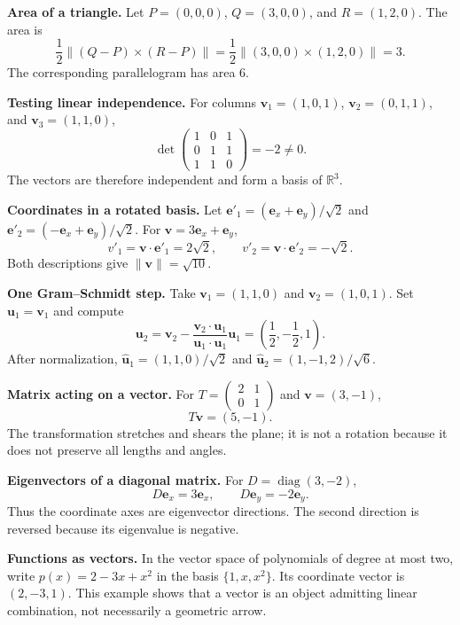 \begin{workedexample}
\textbf{Area of a triangle.}
Let $P=(0,0,0)$, $Q=(3,0,0)$, and $R=(1,2,0)$. The area is
\[
\frac12\lVert(Q-P)\times(R-P)\rVert
=\frac12\lVert(3,0,0)\times(1,2,0)\rVert=3.
\]
The corresponding parallelogram has area $6$.
\end{workedexample}

\begin{workedexample}
\textbf{Testing linear independence.}
For columns $\mathbf v_1=(1,0,1)$, $\mathbf v_2=(0,1,1)$, and
$\mathbf v_3=(1,1,0)$,
\[
\det\begin{pmatrix}1&0&1\\0&1&1\\1&1&0\end{pmatrix}=-2\neq0.
\]
The vectors are therefore independent and form a basis of $\mathbb R^3$.
\end{workedexample}

\begin{workedexample}
\textbf{Coordinates in a rotated basis.}
Let $\mathbf e'_1=(\mathbf e_x+\mathbf e_y)/\sqrt2$ and
$\mathbf e'_2=(-\mathbf e_x+\mathbf e_y)/\sqrt2$. For
$\mathbf v=3\mathbf e_x+\mathbf e_y$,
\[
v'_1=\mathbf v\cdot\mathbf e'_1=2\sqrt2,
\qquad
v'_2=\mathbf v\cdot\mathbf e'_2=-\sqrt2.
\]
Both descriptions give $\lVert\mathbf v\rVert=\sqrt{10}$.
\end{workedexample}

\begin{workedexample}
\textbf{One Gram--Schmidt step.}
Take $\mathbf v_1=(1,1,0)$ and $\mathbf v_2=(1,0,1)$. Set
$\mathbf u_1=\mathbf v_1$ and compute
\[
\mathbf u_2=\mathbf v_2-
\frac{\mathbf v_2\cdot\mathbf u_1}{\mathbf u_1\cdot\mathbf u_1}\mathbf u_1
=\left(\frac12,-\frac12,1\right).
\]
After normalization,
$\widehat{\mathbf u}_1=(1,1,0)/\sqrt2$ and
$\widehat{\mathbf u}_2=(1,-1,2)/\sqrt6$.
\end{workedexample}

\begin{workedexample}
\textbf{Matrix acting on a vector.}
For
$T=\begin{pmatrix}2&1\\0&1\end{pmatrix}$ and $\mathbf v=(3,-1)$,
\[
T\mathbf v=(5,-1).
\]
The transformation stretches and shears the plane; it is not a rotation because it does not preserve all lengths and angles.
\end{workedexample}

\begin{workedexample}
\textbf{Eigenvectors of a diagonal matrix.}
For
$D=\operatorname{diag}(3,-2)$,
\[
D\mathbf e_x=3\mathbf e_x,
\qquad
D\mathbf e_y=-2\mathbf e_y.
\]
Thus the coordinate axes are eigenvector directions. The second direction is reversed because its eigenvalue is negative.
\end{workedexample}

\begin{workedexample}
\textbf{Functions as vectors.}
In the vector space of polynomials of degree at most two, write
$p(x)=2-3x+x^2$ in the basis $\{1,x,x^2\}$. Its coordinate vector is
$(2,-3,1)$. This example shows that a vector is an object admitting linear combination, not necessarily a geometric arrow.
\end{workedexample}
